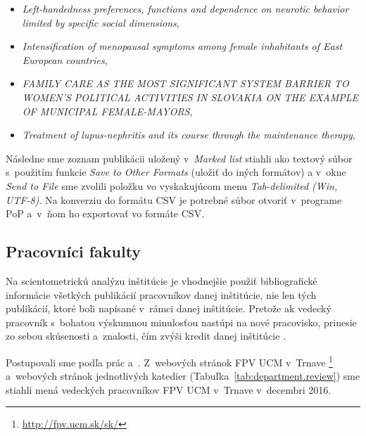 \begin{itemize}
\item \emph{Left-handedness preferences, functions and dependence on neurotic
    behavior limited by specific social dimensions},
\item \emph{Intensification of menopausal symptoms among female inhabitants of
    East European countries},
\item \emph{FAMILY CARE AS THE MOST SIGNIFICANT SYSTEM BARRIER TO WOMEN'S
    POLITICAL ACTIVITIES IN SLOVAKIA ON THE EXAMPLE OF MUNICIPAL FEMALE-MAYORS},
\item \emph{Treatment of lupus-nephritis and its course through the maintenance
    therapy},
\end{itemize}

Následne sme zoznam publikácii uložený v~\emph{Marked list} stiahli ako textový
súbor s~použitím funkcie \emph{Save to Other Formats} (uložiť do iných formátov)
a v~okne \emph{Send to File} sme zvolili položku vo vyskakujúcom menu
\emph{Tab-delimited (Win, UTF-8)}.  Na konverziu do formátu CSV je potrebné
súbor otvoriť v~programe PoP \citep{Harzing2011} a~v~ňom ho exportovať vo
formáte CSV.


\subsection{Pracovníci fakulty}
\label{sec:staff.mining}

Na scientometrickú analýzu inštitúcie je vhodnejšie použiť bibliografické
informácie všetkých publikácií pracovníkov danej inštitúcie, nie len tých
publikácií, ktoré boli napísané v~rámci danej inštitúcie.  Pretože ak vedecký
pracovník s~bohatou výskumnou minulosťou nastúpi na nové pracovisko, prinesie zo
sebou skúsenosti a~znalosti, čím zvýši kredit danej inštitúcie
\citep{Altanopoulou2012}.

Postupovali sme podľa prác \citet{Kazakis2014a}
a~\citet{Kazakis2014b,Kazakis2015}.  Z~webových stránok FPV UCM v~Trnave%
\footnote{\url{http://fpv.ucm.sk/sk/}} a~webových stránok jednotlivých
katedier (Tabuľka~\ref{tab:department.review}) sme stiahli mená vedeckých
pracovníkov FPV UCM v~Trnave v~decembri 2016.

